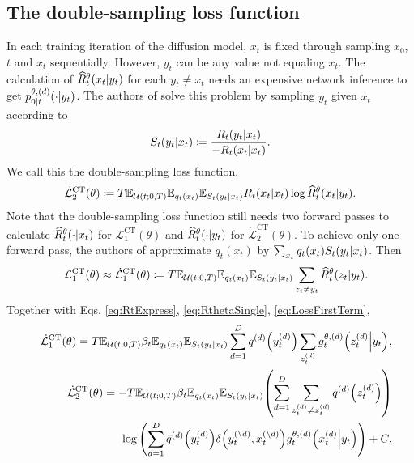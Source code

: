 \documentclass{article}
\begin{document}
\subsection{The double-sampling loss function}

In each training iteration of the diffusion model, $x_t$ is fixed through sampling $x_0$, $t$ and $x_t$ sequentially. However, $y_t$ can be any value not equaling $x_t$. The calculation of $\widehat{R}^\theta_t\qty(x_t\middle|y_t)$ for each $y_t\neq x_t$ needs an expensive network inference to get $p^{\theta,(d)}_{0|t}\qty(\cdot\middle|y_t)$. The authors of \cite{campbell2022continuous} solve this problem by sampling $y_t$ given $x_t$ according to
\begin{eqnarray}
  S_t\qty(y_t|x_t) \coloneqq \frac{R_t\qty(y_t|x_t)}{-R_t\qty(x_t|x_t)}.
\end{eqnarray}
We call this the double-sampling loss function.
\begin{eqnarray*}
  \dot{\mathcal{L}}_2^\text{CT}(\theta) \coloneqq T\mathbb{E}_{\mathcal{U}(t;0,T)}\mathbb{E}_{q_t\qty(x_t)}\mathbb{E}_{S_t\qty(y_t\middle|x_t)}R_t\qty(x_t|x_t)\log\widehat{R}_t^\theta\qty(x_t\middle|y_t).
\end{eqnarray*}
Note that the double-sampling loss function still needs two forward passes to calculate $\widehat{R}_t^\theta\qty(\cdot\middle|x_t)$ for $\mathcal{L}_1^\text{CT}(\theta)$ and $\widehat{R}_t^\theta\qty(\cdot\middle|y_t)$ for $\dot{\mathcal{L}}_2^\text{CT}(\theta)$. To achieve only one forward pass, the authors of \cite{campbell2022continuous} approximate $q_t(x_t)$ by $\sum_{x_t}q_t(x_t)S_t\qty(y_t|x_t)$. Then
\begin{eqnarray*}
  &&\mathcal{L}_1^\text{CT}(\theta)\approx \dot{\mathcal{L}}_1^\text{CT}(\theta) \coloneqq T\mathbb{E}_{\mathcal{U}(t;0,T)}\mathbb{E}_{q_t\qty(x_t)}\mathbb{E}_{S_t\qty(y_t\middle|x_t)}\sum_{z_t\neq y_t}\widehat{R}_t^\theta\qty(z_t\middle|y_t).
\end{eqnarray*}
Together with Eqs. \eqref{eq:RtExpress}, \eqref{eq:RthetaSingle}, \eqref{eq:LossFirstTerm},
\begin{eqnarray}\label{eq:ELBOoriginal}
&&\dot{\mathcal{L}}_1^\text{CT}(\theta) = T\mathbb{E}_{\mathcal{U}(t;0,T)}\beta_t\mathbb{E}_{q_t\qty(x_t)}\mathbb{E}_{S_t\qty(y_t\middle|x_t)}\sum_{d=1}^D\bar{q}^{(d)}\qty(y^{(d)}_t)\sum_{z^{(d)}_t}g^{\theta,(d)}_t\qty(z^{(d)}_t\middle|y_t),\\
&&\dot{\mathcal{L}}_2^\text{CT}(\theta) = -T\mathbb{E}_{\mathcal{U}(t;0,T)}\beta_t\mathbb{E}_{q_t\qty(x_t)}\mathbb{E}_{S_t\qty(y_t\middle|x_t)}\qty(\sum_{d=1}^D\sum_{z^{(d)}_t\neq x^{(d)}_t}\bar{q}^{(d)}\qty(z^{(d)}_t))\nonumber\\
&&\log\qty(\sum_{d=1}^D \bar{q}^{(d)}\qty(y^{(d)}_t)\delta\qty(y^{(\setminus d)}_t,x^{(\setminus d)}_t) g^{\theta,(d)}_t\qty(x^{(d)}_t\middle|y_t)) + C.
\end{eqnarray}
\end{document}
